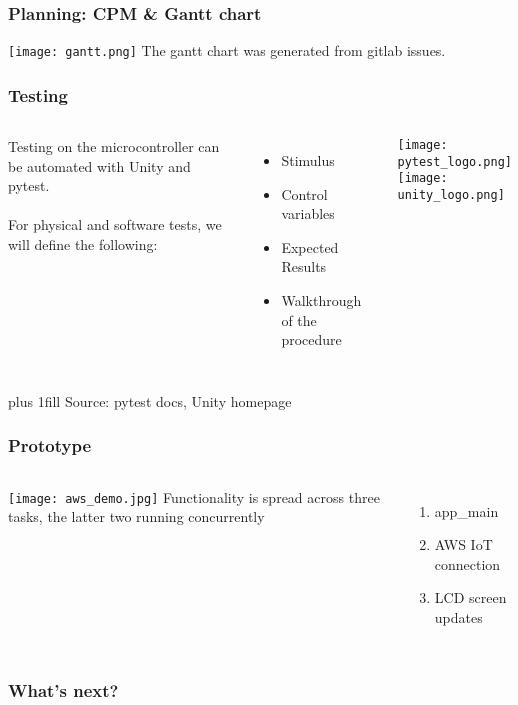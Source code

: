 \documentclass{beamer}
\begin{document}
\begin{frame}
  \frametitle{Planning: CPM \& Gantt chart}
  \texttt{[image: gantt.png]}
  The gantt chart was generated from gitlab issues.
\end{frame}

\begin{frame}
  \frametitle{Testing}

  \begin{columns}
    Testing on the microcontroller can be automated with Unity and pytest.
    \\~\\
    For physical and software tests, we will define the following:
    \begin{itemize}
      \item Stimulus
      \item Control variables
      \item Expected Results
      \item Walkthrough of the procedure
    \end{itemize}

    \texttt{[image: pytest\_logo.png]} \\
    \texttt{[image: unity\_logo.png]}

  \end{columns}
  \vskip0pt plus 1fill
  \hfill {\tiny Source: pytest docs, Unity homepage}
\end{frame}

\begin{frame}
  \frametitle{Prototype}
  \begin{columns}
    \texttt{[image: aws\_demo.jpg]}
    Functionality is spread across three tasks, the latter two running concurrently
    \begin{enumerate}
      \item app\_main
      \item AWS IoT connection
      \item LCD screen updates
    \end{enumerate}
  \end{columns}
\end{frame}

\begin{frame}
  \frametitle{What's next?}
\end{frame}
\end{document}
